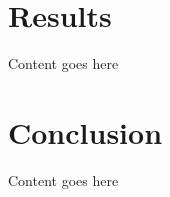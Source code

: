 \documentclass[11pt]{article} %
\begin{document}
\section{Results}

Content goes here

\section{Conclusion}

Content goes here

\renewcommand{\bibname}{References}


\end{document}
